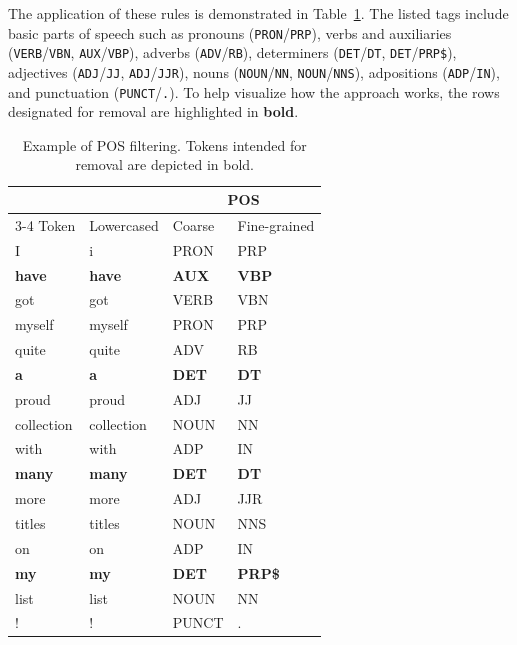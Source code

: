 \documentclass[a4paper,fleqn]{cas-dc}
\newcommand{\postag}[1]{\texttt{#1}}
\begin{document}
The application of these rules is demonstrated in Table~\ref{tab:pos-filtering}. The listed tags include basic parts of speech such as pronouns (\postag{PRON}/\postag{PRP}), verbs and auxiliaries (\postag{VERB}/\postag{VBN}, \postag{AUX}/\postag{VBP}), adverbs (\postag{ADV}/\postag{RB}), determiners (\postag{DET}/\postag{DT}, \postag{DET}/\postag{PRP\$}), adjectives (\postag{ADJ}/\postag{JJ}, \postag{ADJ}/\postag{JJR}), nouns (\postag{NOUN}/\postag{NN}, \postag{NOUN}/\postag{NNS}), adpositions (\postag{ADP}/\postag{IN}), and punctuation (\postag{PUNCT}/\postag{.}). To help visualize how the approach works, the rows designated for removal are highlighted in \textbf{bold}.

\begin{table}[tbp]%
	\centering
	\caption{Example of POS filtering. Tokens intended for removal are depicted in bold.}
	\label{tab:pos-filtering}
	\begin{tabular}{l l l l}
		\toprule
                      &               & \multicolumn{2}{c}{POS}\\ \cmidrule{3-4}
		Token         & Lowercased    & Coarse    & Fine-grained  \\ \midrule		
		I             & i             & PRON         & PRP              \\
		\textbf{have} & \textbf{have} & \textbf{AUX} & \textbf{VBP}     \\
		got           & got           & VERB         & VBN              \\
		myself        & myself        & PRON         & PRP              \\
		quite         & quite         & ADV          & RB               \\
		\textbf{a}    & \textbf{a}    & \textbf{DET} & \textbf{DT}      \\
		proud         & proud         & ADJ          & JJ               \\
		collection    & collection    & NOUN         & NN               \\
		with          & with          & ADP          & IN               \\
		\textbf{many} & \textbf{many} & \textbf{DET} & \textbf{DT}      \\
		more          & more          & ADJ          & JJR              \\
		titles        & titles        & NOUN         & NNS              \\
		on            & on            & ADP          & IN               \\
		\textbf{my}   & \textbf{my}   & \textbf{DET} & \textbf{PRP\$}   \\
		list          & list          & NOUN         & NN               \\
		!             & !             & PUNCT        & .                \\ \bottomrule
	\end{tabular}
\end{table}
\end{document}
